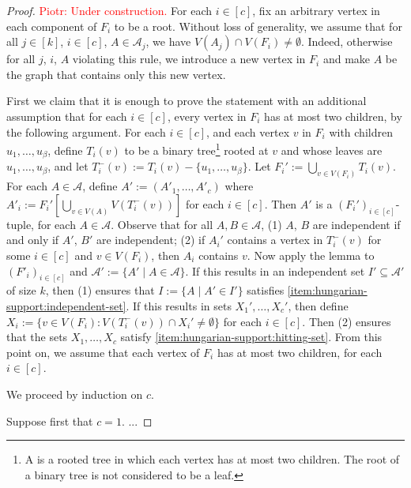 \documentclass{patmorin}
\newcommand{\piotr}[1]{\textcolor{red}{Piotr: #1}}
\begin{document}
\begin{proof}
\piotr{Under construction.}
For each $i\in[c]$, fix an arbitrary vertex in each component of $F_i$ to be a root. 
Without loss of generality, 
we assume that for all $j\in[k]$, $i\in[c]$, $A\in\mathcal{A}_j$, 
we have $V(A_j)\cap V(F_i)\neq\emptyset$. 
Indeed, otherwise for all $j$, $i$, $A$ violating this rule, we introduce a new vertex in $F_i$ and make $A$ be the graph that contains only this new vertex.

First we claim that it is enough to prove the statement with an additional assumption that for each $i\in[c]$, every vertex in $F_i$ has at most two children, by the following argument.
For each $i\in[c]$, and each vertex $v$ in $F_i$ with children $u_1,\ldots,u_\beta$, define $T_i(v)$ to be a binary tree\footnote{A  is a rooted tree in which each vertex has at most two children. The root of a binary tree is not considered to be a leaf.} rooted at $v$ and whose leaves are $u_1,\ldots,u_\beta$, and let $T^-_i(v):=T_i(v)-\{u_1,\ldots,u_\beta\}$.  Let $F_i':=\bigcup_{v\in V(F_i)} T_i(v)$.  For each $A\in\mathcal{A}$, define $A':=(A'_1,\ldots,A'_c)$ where $A'_i:=F_i'[\bigcup_{v\in V(A)} V(T^-_i(v))]$ for each $i\in [c]$.  Then $A'$ is a $(F_i')_{i\in[c]}$-tuple, for each $A\in\mathcal{A}$. Observe that for all $A,B\in\mathcal{A}$, 
(1) $A$, $B$ are independent if and only if $A'$, $B'$ are independent; 
(2) if $A_i'$ contains a vertex in $T_i^-(v)$ for some $i\in[c]$ and $v\in V(F_i)$, then $A_i$ contains $v$.  Now apply the lemma to $(F'_i)_{i\in[c]}$ and $\mathcal{A}':=\{A'\mid A\in\mathcal{A}\}$.  If this results in an independent set $I'\subseteq\mathcal{A}'$ of size $k$, then (1) ensures that $I:=\{A\mid A'\in I'\}$ satisfies \cref{item:hungarian-support:independent-set}.  If this results in sets $X_1',\ldots,X_c'$, then define $X_i:=\{v\in V(F_i): V(T_i^-(v))\cap X_i'\neq\emptyset\}$ for each $i\in[c]$.  Then (2) ensures that the sets $X_1,\ldots,X_c$ satisfy \cref{item:hungarian-support:hitting-set}.  From this point on, we assume that each vertex of $F_i$ has at most two children, for each $i\in[c]$.  

We proceed by induction on $c$.

Suppose first that $c=1$. ...


\end{proof}
\end{document}
